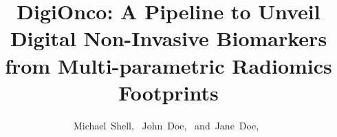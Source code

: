 \documentclass[10pt,journal,compsoc]{IEEEtran}
\begin{document}
%
\title{DigiOnco: A Pipeline to Unveil Digital Non-Invasive Biomarkers from Multi-parametric Radiomics Footprints}
%
%
%
%

\author{Michael~Shell,~
        John~Doe,~
        and~Jane~Doe,~%
}
\end{document}
